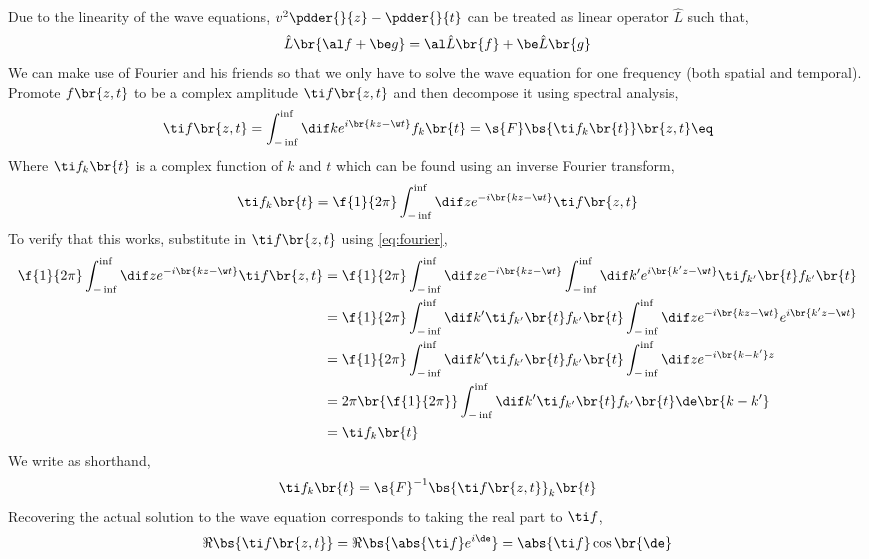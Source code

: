 \documentclass{article}
\begin{document}
Due to the linearity of the wave equations, $v^2 \pdder{}{z} - \pdder{}{t}$ can be treated as linear operator $\hat L$ such that,
\[ \hat L \br{\al f + \be g} = \al \hat L \br{f} + \be \hat L \br{g} \]
We can make use of Fourier and his friends so that we only have to solve the wave equation for one frequency (both spatial and temporal). Promote $f\br{z,t}$ to be a complex amplitude $\ti f\br{z, t}$ and then decompose it using spectral analysis,
\[ \ti f\br{z,t} = \int_{-\inf}^{\inf} \dif k e^{i \br{kz - \w t}} f_{k} \br{t} = \s{F}\bs{ \ti f_{k} \br{t}}\br{z,t} \eq \label{eq:fourier}\]
Where $\ti f_{k} \br{t}$ is a complex function of $k$ and $t$ which can be found using an inverse Fourier transform,
\[ \ti f_{k} \br{t} = \f{1}{2\pi}\int_{-\inf}^{\inf} \dif z e^{-i \br{k z - \w t} }\ti f\br{z,t}  \]
To verify that this works, substitute in $\ti f\br{z,t}$ using \cref{eq:fourier},
\begin{align*}
    \f{1}{2\pi} \int_{-\inf}^{\inf} \dif z e^{-i \br{k z - \w t} }\ti f\br{z,t}
    &= \f{1}{2\pi}\int_{-\inf}^{\inf} \dif z e^{-i \br{k z - \w t} }\int_{-\inf}^{\inf} \dif k' e^{i \br{k'z - \w t}} \ti f_{k'} \br{t}f_{k'} \br{t} \\
    &= \f{1}{2\pi}\int_{-\inf}^{\inf} \dif k'  \ti f_{k'} \br{t}f_{k'} \br{t} \int_{-\inf}^{\inf} \dif z e^{-i \br{k z - \w t} } e^{i \br{k'z - \w t}} \\
    &= \f{1}{2\pi}\int_{-\inf}^{\inf} \dif k'  \ti f_{k'} \br{t}f_{k'} \br{t} \int_{-\inf}^{\inf} \dif z e^{-i\br{k - k'} z} \\
    &= 2 \pi \br{\f{1}{2\pi}} \int_{-\inf}^{\inf} \dif k'  \ti f_{k'} \br{t}f_{k'} \br{t} \de\br{k - k'} \\
    &= \ti f_{k} \br{t}
\end{align*}
We write as shorthand,
\[ \ti f_k \br{t} = \s{F}^{-1}\bs{\ti f\br{z,t}}_k \br{t} \]
Recovering the actual solution to the wave equation corresponds to taking the real part to $\ti f$,
\[ \Re \bs{\ti f \br{z, t}} = \Re \bs{\abs{\ti f}e^{i \de}} = \abs{\ti f}\cos\br{\de} \]
\end{document}
